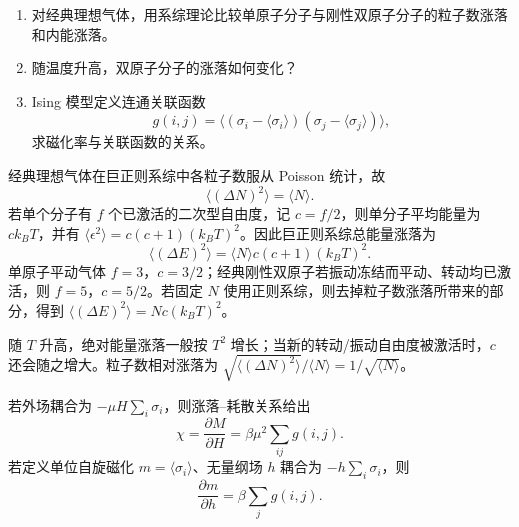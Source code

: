 \begin{question}[10 分]
\begin{enumerate}
  \item 对经典理想气体，用系综理论比较单原子分子与刚性双原子分子的粒子数涨落和内能涨落。
  \item 随温度升高，双原子分子的涨落如何变化？
  \item Ising 模型定义连通关联函数
  \[g(i,j)=\langle(\sigma_i-\langle\sigma_i\rangle)(\sigma_j-\langle\sigma_j\rangle)\rangle,\]
  求磁化率与关联函数的关系。
\end{enumerate}
\begin{solution}
经典理想气体在巨正则系综中各粒子数服从 Poisson 统计，故
\[\boxed{\langle(\Delta N)^2\rangle=\langle N\rangle}.\]
若单个分子有 $f$ 个已激活的二次型自由度，记 $c=f/2$，则单分子平均能量为 $c k_BT$，并有 $\langle\epsilon^2\rangle=c(c+1)(k_BT)^2$。因此巨正则系综总能量涨落为
\[\boxed{\langle(\Delta E)^2\rangle=\langle N\rangle c(c+1)(k_BT)^2}.\]
单原子平动气体 $f=3$，$c=3/2$；经典刚性双原子若振动冻结而平动、转动均已激活，则 $f=5$，$c=5/2$。若固定 $N$ 使用正则系综，则去掉粒子数涨落所带来的部分，得到 $\langle(\Delta E)^2\rangle=Nc(k_BT)^2$。

随 $T$ 升高，绝对能量涨落一般按 $T^2$ 增长；当新的转动/振动自由度被激活时，$c$ 还会随之增大。粒子数相对涨落为 $\sqrt{\langle(\Delta N)^2\rangle}/\langle N\rangle=1/\sqrt{\langle N\rangle}$。

若外场耦合为 $-\mu H\sum_i\sigma_i$，则涨落--耗散关系给出
\[\boxed{\chi=\frac{\partial M}{\partial H}=\beta\mu^2\sum_{ij}g(i,j)}.\]
若定义单位自旋磁化 $m=\langle\sigma_i\rangle$、无量纲场 $h$ 耦合为 $-h\sum_i\sigma_i$，则
\[\boxed{\frac{\partial m}{\partial h}=\beta\sum_j g(i,j)}.\]
\end{solution}
\end{question}

